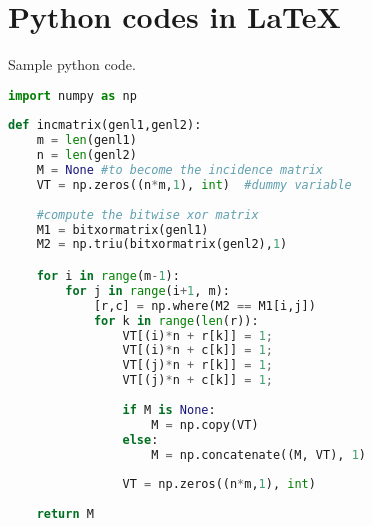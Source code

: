 \documentclass[12pt,a4paper,twoside]{article}
\numberwithin{equation}{section} %
\begin{document}
\newpage

\section{Python codes in \LaTeX}
Sample python code.


\begin{lstlisting}[language=Python, caption=Python example]
import numpy as np
    
def incmatrix(genl1,genl2):
    m = len(genl1)
    n = len(genl2)
    M = None #to become the incidence matrix
    VT = np.zeros((n*m,1), int)  #dummy variable
    
    #compute the bitwise xor matrix
    M1 = bitxormatrix(genl1)
    M2 = np.triu(bitxormatrix(genl2),1) 

    for i in range(m-1):
        for j in range(i+1, m):
            [r,c] = np.where(M2 == M1[i,j])
            for k in range(len(r)):
                VT[(i)*n + r[k]] = 1;
                VT[(i)*n + c[k]] = 1;
                VT[(j)*n + r[k]] = 1;
                VT[(j)*n + c[k]] = 1;
                
                if M is None:
                    M = np.copy(VT)
                else:
                    M = np.concatenate((M, VT), 1)
                
                VT = np.zeros((n*m,1), int)
    
    return M
\end{lstlisting}
\end{document}
